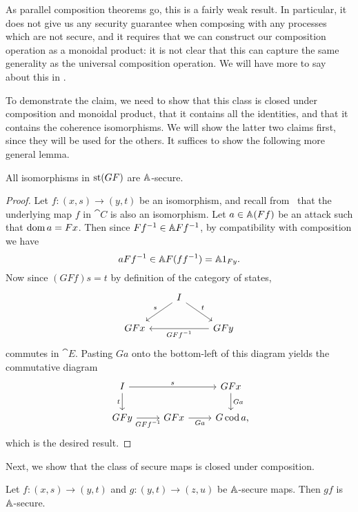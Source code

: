 As parallel composition theorems go, this is a fairly weak result. In
particular, it does not give us any security guarantee when composing with any
processes which are not secure, and it requires that we can construct our
composition operation as a monoidal product: it is not clear that this can
capture the same generality as the universal composition operation. We will have
more to say about this in .

To demonstrate the claim, we need to show that this class is closed under
composition and monoidal product, that it contains all the identities, and that
it contains the coherence isomorphisms. We will show the latter two claims
first, since they will be used for the others. It suffices to show the following
more general lemma.

\begin{lemma}
  All isomorphisms in $\state{GF}$ are $\AA$-secure.
\end{lemma}

\begin{proof}
  Let $f: (x, s)\to (y, t)$ be an isomorphism, and recall
  from~ that the underlying
  map $f$ in $\cat{C}$ is also an isomorphism. Let $a\in\AA (Ff)$ be an attack such
  that $\dom a = Fx$. Then since $Ff^{-1}\in\AA Ff^{-1}$, by compatibility
  with composition we have \[aFf^{-1}\in \AA F(ff^{-1}) = \AA 1_{Fy}.\] Now
  since $(GFf)s = t$ by definition of the category of states, \[
    \begin{tikzcd}
      & I\ar[dl, "s"']\ar[rd, "t"] \\
      GFx && GFy\ar[ll, "GFf^{-1}"]
    \end{tikzcd}
  \] commutes in $\cat{E}$. Pasting $Ga$ onto the bottom-left of this diagram yields the
  commutative diagram
  \[
    \begin{tikzcd}
      I\ar[rr, "s"]\ar[d, "t"'] && GFx\ar[d, "Ga"]\\
      GFy\ar[r, "GFf^{-1}"'] & GFx\ar[r, "Ga"'] & G\cod a\punctuation{,}
    \end{tikzcd}
  \]which is the desired result.
\end{proof}

Next, we show that the class of secure maps is closed under composition.

\begin{lemma}
  Let $f: (x, s)\to (y, t)$ and $g: (y, t)\to (z, u)$ be $\AA$-secure maps.
  Then $gf$ is $\AA$-secure.
\end{lemma}

